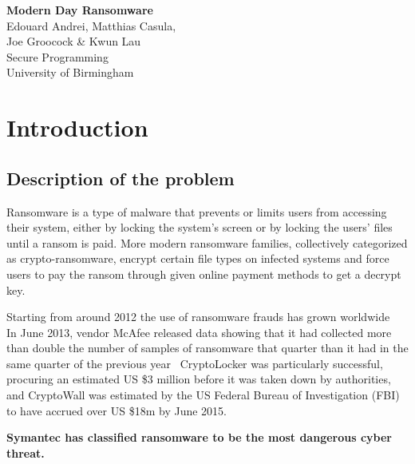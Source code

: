 \documentclass[10pt,a4paper]{article}
\begin{document}

\begin{titlepage}
  \vspace*{\fill}
  \begin{center}
    {\Huge \textbf{Modern Day Ransomware}}\\[0.5cm]
    {\Large Edouard Andrei, Matthias Casula,}\\
    {\Large Joe Groocock \& Kwun Lau}\\[0.6cm]
    {\large Secure Programming}\\
    {\large University of Birmingham}\\[0.4cm]
    {\large {}}
  \end{center}
  \vspace*{\fill}
\end{titlepage}

\tableofcontents

\newpage
{}

\section{Introduction}
\subsection{Description of the problem}
Ransomware is a type of malware that prevents or limits users from accessing their system, either by locking the system's screen or by locking the users' files until a ransom is paid. More modern ransomware families, collectively categorized as crypto-ransomware, encrypt certain file types on infected systems and force users to pay the ransom through given online payment methods to get a decrypt key.\cite{trend}

Starting from around 2012 the use of ransomware frauds has grown worldwide~\cite{grown1}\cite{grown2} In June 2013, vendor McAfee released data showing that it had collected more than double the number of samples of ransomware that quarter than it had in the same quarter of the previous year~\cite{mcafee} CryptoLocker was particularly successful, procuring an estimated US \$3 million before it was taken down by authorities\cite{bbc}, and CryptoWall was estimated by the US Federal Bureau of Investigation (FBI) to have accrued over US \$18m by June 2015.\cite{cyberwall}

\textbf{Symantec has classified ransomware to be the most dangerous cyber threat.~\cite{symantec}}
\end{document}
